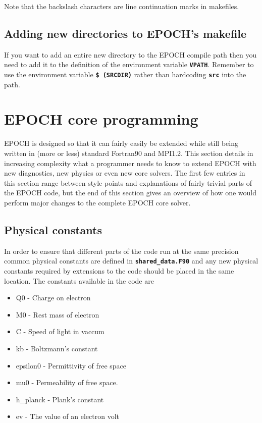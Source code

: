 \documentclass[12pt]{article}
\newcommand{\inlinecode}[1]{{\color{warwickred} \bf\texttt{#1}}}
\newcommand{\nEPOCH}{{\color{warwickdark}\fontfamily{phv}\selectfont EPOCH}}
\newcommand{\EPOCH}{{\nEPOCH} }
\begin{document}
Note that the backslash characters are line continuation marks in makefiles.

\subsection{Adding new directories to EPOCH's makefile}
If you want to add an entire new directory to the \EPOCH compile path then you
need to add it to the definition of the environment variable
\inlinecode{VPATH}. Remember to use the environment variable \inlinecode{\$
(SRCDIR)} rather than hardcoding \inlinecode{src} into the path.

\section{\EPOCH core programming}
\EPOCH is designed so that it can fairly easily be extended while still being
written in (more or less) standard Fortran90 and MPI1.2. This section details
in increasing complexity what a programmer needs to know to extend \EPOCH with
new diagnostics, new physics or even new core solvers. The first few entries
in this section range between style points and explanations of fairly trivial
parts of the \EPOCH code, but the end of this section gives an overview of how
one would perform major changes to the complete \EPOCH core solver.

\subsection{Physical constants}
In order to ensure that different parts of the code run at the same precision
common physical constants are defined in \inlinecode{shared\_data.F90} and any
new physical constants required by extensions to the code should be placed in
the same location. The constants available in the code are
\begin{itemize}
\item Q0 - Charge on electron
\item M0 - Rest mass of electron
\item C - Speed of light in vaccum
\item kb - Boltzmann's constant
\item epsilon0 - Permittivity of free space
\item mu0 - Permeability of free space.
\item h\_planck - Plank's constant
\item ev - The value of an electron volt
\end{itemize}
\end{document}
